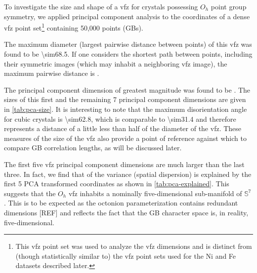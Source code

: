 \documentclass[final,twocolumn,12pt]{elsarticle}
\begin{document}
	To investigate the size and shape of a \gls{vfz} for crystals possessing $O_h$ point group symmetry, we applied principal component analysis to the coordinates of a dense \gls{vfz} point set\footnote{This \gls{vfz} point set was used to analyze the \gls{vfz} dimensions and is distinct from (though statistically similar to) the \gls{vfz} point sets used for the Ni and Fe datasets described later.} containing 50,000 points (GBs).
	
	The maximum diameter (largest pairwise distance between points) of this \gls{vfz} was found to be \SI{\sim68.5}{\tobydeg}. If one considers the shortest path between points, including their symmetric images (which may inhabit a neighboring \gls{vfz} image), the maximum pairwise distance is \minsymdist{}.
	
	The principal component dimension of greatest magnitude was found to be \dimOne{}. The sizes of this first and the remaining 7 principal component dimensions are given in \cref{tab:pca-size}. It is interesting to note that the maximum disorientation angle for cubic crystals is \SI{\sim62.8}{\misodeg}, which is comparable to \SI{\sim31.4}{\tobydeg} and therefore represents a distance of a little less than half of the diameter of the \gls{vfz}. These measures of the size of the \gls{vfz} also provide a point of reference against which to compare GB correlation lengths, as will be discussed later.
	
	\begin{table}[!htb]
	    \centering
    	    \caption{Size of \gls{vfz} in each respective PCA dimension for a set of \num{20000} \glspl{vfzgbo}.}
    	    \label{tab:pca-size}
	\end{table}
	The first five \gls{vfz} principal component dimensions are much larger than the last three. In fact, we find that \percExplained{} of the variance (spatial dispersion) is explained by the first 5 PCA transformed coordinates as shown in \cref{tab:pca-explained}. This suggests that the $O_h$ \gls{vfz} inhabits a nominally five-dimensional sub-manifold of $\mathbb{S}^7$. This is to be expected as the octonion parameterization contains redundant dimensions [REF] and reflects the fact that the GB character space is, in reality, five-dimensional.
	
\end{document}
